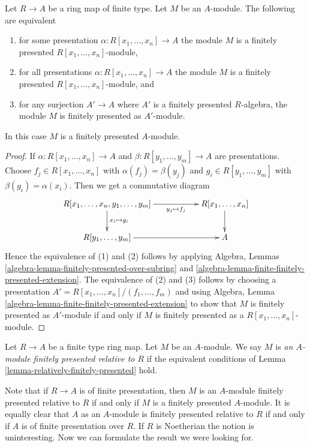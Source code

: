 \begin{lemma}
\label{lemma-relatively-finitely-presented}
Let $R \to A$ be a ring map of finite type.
Let $M$ be an $A$-module.
The following are equivalent
\begin{enumerate}
\item for some presentation $\alpha : R[x_1, \ldots, x_n] \to A$
the module $M$ is a finitely presented $R[x_1, \ldots, x_n]$-module,
\item for all presentations $\alpha : R[x_1, \ldots, x_n] \to A$
the module $M$ is a finitely presented $R[x_1, \ldots, x_n]$-module, and
\item for any surjection $A' \to A$ where $A'$ is a finitely presented
$R$-algebra, the module $M$ is finitely presented as $A'$-module.
\end{enumerate}
In this case $M$ is a finitely presented $A$-module.
\end{lemma}

\begin{proof}
If $\alpha : R[x_1, \ldots, x_n] \to A$ and
$\beta : R[y_1, \ldots, y_m] \to A$ are presentations.
Choose $f_j \in R[x_1, \ldots, x_n]$ with $\alpha(f_j) = \beta(y_j)$
and $g_i \in R[y_1, \ldots, y_m]$ with $\beta(g_i) = \alpha(x_i)$.
Then we get a commutative diagram
$$
\xymatrix{
R[x_1, \ldots, x_n, y_1, \ldots, y_m]
\ar[d]^{x_i \mapsto g_i} \ar[rr]_-{y_j \mapsto f_j} & &
R[x_1, \ldots, x_n] \ar[d] \\
R[y_1, \ldots, y_m] \ar[rr] & & A
}
$$
Hence the equivalence of (1) and (2) follows by applying
Algebra, Lemmas \ref{algebra-lemma-finitely-presented-over-subring} and
\ref{algebra-lemma-finite-finitely-presented-extension}.
The equivalence of (2) and (3) follows by choosing a presentation
$A' = R[x_1, \ldots, x_n]/(f_1, \ldots, f_m)$ and using
Algebra, Lemma \ref{algebra-lemma-finite-finitely-presented-extension}
to show that $M$ is finitely presented as $A'$-module if and only if
$M$ is finitely presented as a $R[x_1, \ldots, x_n]$-module.
\end{proof}

\begin{definition}
\label{definition-relatively-finitely-presented}
Let $R \to A$ be a finite type ring map. Let $M$ be an $A$-module.
We say $M$ is {\it an $A$-module finitely presented relative to $R$}
if the equivalent conditions of
Lemma \ref{lemma-relatively-finitely-presented}
hold.
\end{definition}

\noindent
Note that if $R \to A$ is of finite presentation, then $M$ is an
$A$-module finitely presented relative to $R$ if and only if $M$
is a finitely presented $A$-module. It is equally clear that $A$ as
an $A$-module is finitely presented relative to $R$ if and only if
$A$ is of finite presentation over $R$. If $R$ is Noetherian the notion
is uninteresting. Now we can formulate the result we were looking for.

